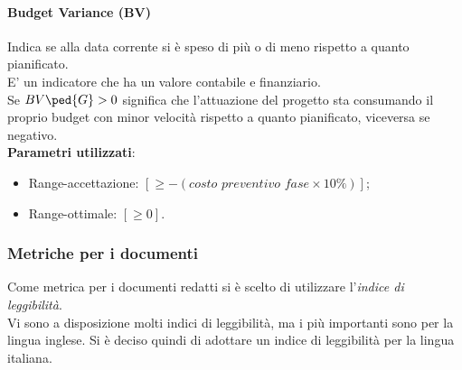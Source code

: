 \paragraph{Budget Variance (BV)}
Indica se alla data corrente si è speso di più o di meno rispetto a quanto pianificato.\\
E' un indicatore che ha un valore contabile e finanziario.\\
Se $BV\ped{G} > 0$ significa che l'attuazione del progetto sta consumando il proprio budget con minor velocità rispetto a quanto pianificato, viceversa se negativo.\\
\textbf{Parametri utilizzati}:
\begin{itemize}
\item Range-accettazione: $[\geq-(\textit{costo preventivo fase}\times10\%)]$;
\item Range-ottimale: $[\geq0]$.
\end{itemize}

\subsubsection{Metriche per i documenti}
Come metrica per i documenti redatti si è scelto di utilizzare l'\textit{indice di leggibilità}.\\
Vi sono a disposizione molti indici di leggibilità, ma i più importanti sono per la lingua inglese. Si è deciso quindi di adottare un indice di leggibilità per la lingua italiana.

